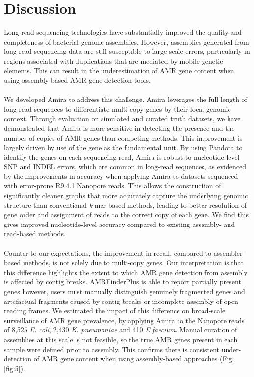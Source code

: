 \section*{Discussion}
\paragraph{}
Long-read sequencing technologies have substantially improved the quality and completeness of bacterial genome assemblies. However, assemblies generated from long read sequencing data are still susceptible to large-scale errors, particularly in regions associated with duplications that are mediated by mobile genetic elements. This can result in the underestimation of AMR gene content when using assembly-based AMR gene detection tools.
\paragraph{}
We developed Amira to address this challenge. Amira leverages the full length of long read sequences to differentiate multi-copy genes by their local genomic context. Through evaluation on simulated and curated truth datasets, we have demonstrated that Amira is more sensitive in detecting the presence and the number of copies of AMR genes than competing methods. This improvement is largely driven by use of the gene as the fundamental unit. By using Pandora \cite{pandora} to identify the genes on each sequencing read, Amira is robust to nucleotide-level SNP and INDEL errors, which are common in long-read sequences, as evidenced by the improvements in accuracy when applying Amira to datasets sequenced with error-prone R9.4.1 Nanopore reads. This allows the construction of significantly cleaner graphs that more accurately capture the underlying genomic structure than conventional \textit{k}-mer based methods, leading to better resolution of gene order and assignment of reads to the correct copy of each gene. We find this gives improved nucleotide-level accuracy compared to existing assembly- and read-based methods. 
\paragraph{}
Counter to our expectations, the improvement in recall, compared to assembler-based methods, is not solely due to multi-copy genes. Our interpretation is that this difference highlights the extent to which AMR gene detection from assembly is affected by contig breaks. AMRFinderPlus is able to report partially present genes however, users must manually distinguish genuinely fragmented genes and artefactual fragments caused by contig breaks or incomplete assembly of open reading frames. We estimated the impact of this difference on broad-scale surveillance of AMR gene prevalence, by applying Amira to the Nanopore reads of 8,525 \textit{E. coli}, 2,430 \textit{K. pneumoniae} and 410 \textit{E faecium}. Manual curation of assemblies at this scale is not feasible, so the true AMR genes present in each sample were defined prior to assembly. This confirms there is consistent under-detection of AMR gene content when using assembly-based approaches (Fig. \ref{fig:5}).
